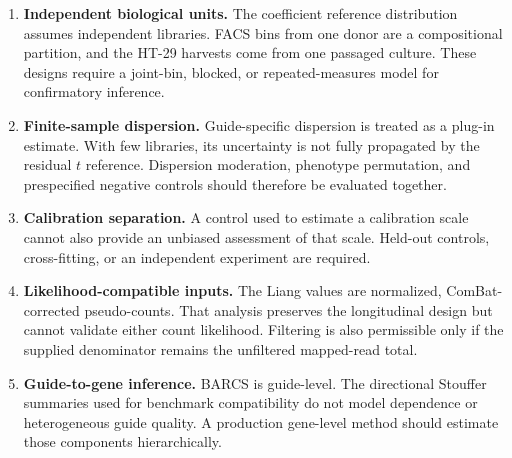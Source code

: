\begin{enumerate}
  \item \textbf{Independent biological units.}  The coefficient reference
  distribution assumes independent libraries.  FACS bins from one donor are a
  compositional partition, and the HT-29 harvests come from one passaged
  culture.  These designs require a joint-bin, blocked, or repeated-measures
  model for confirmatory inference.

  \item \textbf{Finite-sample dispersion.}  Guide-specific dispersion is
  treated as a plug-in estimate.  With few libraries, its uncertainty is not
  fully propagated by the residual $t$ reference.  Dispersion moderation,
  phenotype permutation, and prespecified negative controls should therefore
  be evaluated together.

  \item \textbf{Calibration separation.}  A control used to estimate a
  calibration scale cannot also provide an unbiased assessment of that scale.
  Held-out controls, cross-fitting, or an independent experiment are required.

  \item \textbf{Likelihood-compatible inputs.}  The Liang values are
  normalized, ComBat-corrected pseudo-counts.  That analysis preserves the
  longitudinal design but cannot validate either count likelihood.  Filtering
  is also permissible only if the supplied denominator remains the unfiltered
  mapped-read total.

  \item \textbf{Guide-to-gene inference.}  BARCS is guide-level.  The
  directional Stouffer summaries used for benchmark compatibility do not model
  dependence or heterogeneous guide quality.  A production gene-level method
  should estimate those components hierarchically.
\end{enumerate}
